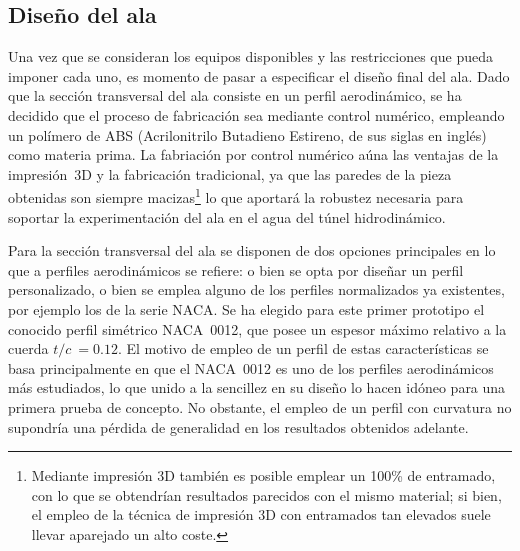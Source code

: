 \subsection{Diseño del ala}

Una vez que se consideran los equipos disponibles y las restricciones que pueda imponer cada uno, es momento de pasar a especificar el diseño final del ala. Dado que la sección transversal del ala consiste en un perfil aerodinámico, se ha decidido que el proceso de fabricación sea mediante control numérico, empleando un polímero de ABS (Acrilonitrilo Butadieno Estireno, de sus siglas en inglés) como materia prima. La fabriación por control numérico aúna las ventajas de la impresión~3D y la fabricación tradicional, ya que las paredes de la pieza obtenidas son siempre macizas\footnote{Mediante impresión 3D también es posible emplear un 100\% de entramado, con lo que se obtendrían resultados parecidos con el mismo material; si bien, el empleo de la técnica de impresión 3D con entramados tan elevados suele llevar aparejado un alto coste.} lo que aportará la robustez necesaria para soportar la experimentación del ala en el agua del túnel hidrodinámico.

Para la sección transversal del ala se disponen de dos opciones principales en lo que a perfiles aerodinámicos se refiere: o bien se opta por diseñar un perfil personalizado, o bien se emplea alguno de los perfiles normalizados ya existentes, por ejemplo los de la serie NACA. Se ha elegido para este primer prototipo el conocido perfil simétrico NACA~0012, que posee un espesor máximo relativo a la cuerda $t/c\ = 0.12$. El motivo de empleo de un perfil de estas características se basa principalmente en que el NACA~0012 es uno de los perfiles aerodinámicos más estudiados, lo que unido a la sencillez en su diseño lo hacen idóneo para una primera prueba de concepto. No obstante, el empleo de un perfil con curvatura no supondría una pérdida de generalidad en los resultados obtenidos adelante.


